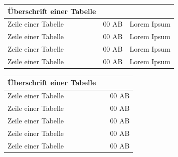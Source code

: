 \documentclass[xcolor=table,9pt,aspectratio=169]{beamer}
\begin{document}
\begin{frame}

\renewcommand{\arraystretch}{1.5}
\begin{tabular}[h]{p{8cm}cr}
\arrayrulecolor{blue2}\hline
\textbf{Überschrift einer Tabelle}\\
\hline
Zeile einer Tabelle & 00 AB & Lorem Ipsum \\
Zeile einer Tabelle & 00 AB & Lorem Ipsum \\
Zeile einer Tabelle & 00 AB & Lorem Ipsum \\
Zeile einer Tabelle & 00 AB & Lorem Ipsum \\
\hline
\end{tabular}

\bigskip

\begin{tabular}[h]{lcr}
\arrayrulecolor{blue2}\hline
\textbf{Überschrift einer Tabelle}\\
\hline
Zeile einer Tabelle && 00 AB \\
Zeile einer Tabelle && 00 AB \\
Zeile einer Tabelle && 00 AB \\
Zeile einer Tabelle && 00 AB \\
Zeile einer Tabelle && 00 AB \\
\hline
\end{tabular}

\end{frame}
\end{document}
